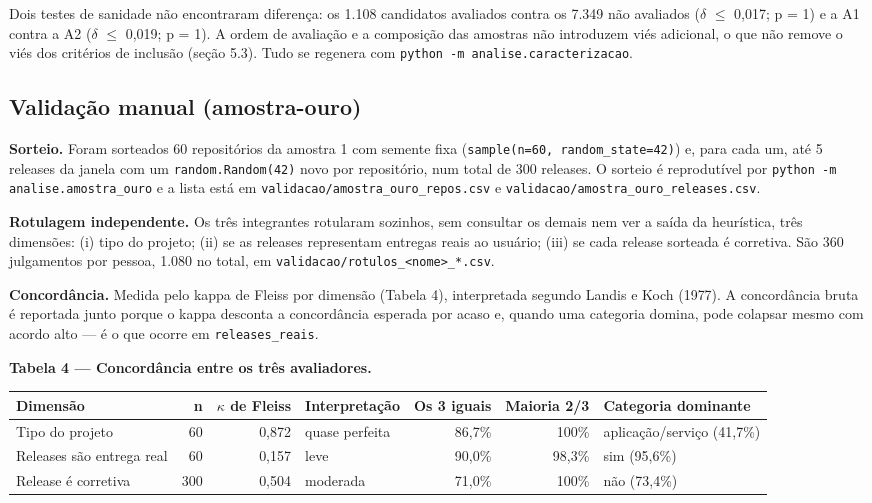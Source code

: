 \documentclass[12pt]{article}
\begin{document}
Dois testes de sanidade não encontraram diferença: os 1.108 candidatos avaliados contra os 7.349 não avaliados ($\delta$ $\leq$ 0,017; p = 1) e a A1 contra a A2 ($\delta$ $\leq$ 0,019; p = 1). A ordem de avaliação e a composição das amostras não introduzem viés adicional, o que não remove o viés dos critérios de inclusão (seção 5.3). Tudo se regenera com \texttt{python -m analise.caracterizacao}.

\subsection{Validação manual (amostra-ouro)}

\textbf{Sorteio.} Foram sorteados 60 repositórios da amostra 1 com semente fixa (\texttt{sample(n=60, random\_state=42)}) e, para cada um, até 5 releases da janela com um \texttt{random.Random(42)} novo por repositório, num total de 300 releases. O sorteio é reprodutível por \texttt{python -m analise.amostra\_ouro} e a lista está em \texttt{validacao/amostra\_ouro\_repos.csv} e \texttt{validacao/amostra\_ouro\_releases.csv}.

\textbf{Rotulagem independente.} Os três integrantes rotularam sozinhos, sem consultar os demais nem ver a saída da heurística, três dimensões: (i) tipo do projeto; (ii) se as releases representam entregas reais ao usuário; (iii) se cada release sorteada é corretiva. São 360 julgamentos por pessoa, 1.080 no total, em \texttt{validacao/rotulos\_<nome>\_*.csv}.

\textbf{Concordância.} Medida pelo kappa de Fleiss por dimensão (Tabela 4), interpretada segundo Landis e Koch (1977). A concordância bruta é reportada junto porque o kappa desconta a concordância esperada por acaso e, quando uma categoria domina, pode colapsar mesmo com acordo alto — é o que ocorre em \texttt{releases\_reais}.

\textbf{Tabela 4 — Concordância entre os três avaliadores.}

\begin{table}[!htbp]
\centering
\scriptsize
\begin{tabular}{lrrlrrl}
\toprule
\textbf{Dimensão} & \textbf{n} & \textbf{$\kappa$ de Fleiss} & \textbf{Interpretação} & \textbf{Os 3 iguais} & \textbf{Maioria 2/3} & \textbf{Categoria dominante} \\
\midrule
Tipo do projeto & 60 & 0,872 & quase perfeita & 86,7\% & 100\% & aplicação/serviço (41,7\%) \\
Releases são entrega real & 60 & 0,157 & leve & 90,0\% & 98,3\% & sim (95,6\%) \\
Release é corretiva & 300 & 0,504 & moderada & 71,0\% & 100\% & não (73,4\%) \\
\bottomrule
\end{tabular}
\end{table}
\end{document}
